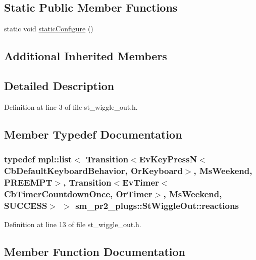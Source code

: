 \subsection*{Static Public Member Functions}
\begin{DoxyCompactItemize}
\item 
static void \hyperlink{structsm__pr2__plugs_1_1StWiggleOut_ad4db8d9b75e1fd0fb6641666d0b10554}{static\+Configure} ()
\end{DoxyCompactItemize}
\subsection*{Additional Inherited Members}


\subsection{Detailed Description}


Definition at line 3 of file st\+\_\+wiggle\+\_\+out.\+h.



\subsection{Member Typedef Documentation}
\subsubsection[{\texorpdfstring{reactions}{reactions}}]{\setlength{\rightskip}{0pt plus 5cm}typedef mpl\+::list$<$ Transition$<$Ev\+Key\+PressN$<$Cb\+Default\+Keyboard\+Behavior, {\bf Or\+Keyboard}$>$, {\bf Ms\+Weekend}, {\bf P\+R\+E\+E\+M\+PT}$>$, Transition$<$Ev\+Timer$<$Cb\+Timer\+Countdown\+Once, {\bf Or\+Timer}$>$, {\bf Ms\+Weekend}, {\bf S\+U\+C\+C\+E\+SS}$>$ $>$ {\bf sm\+\_\+pr2\+\_\+plugs\+::\+St\+Wiggle\+Out\+::reactions}}\hypertarget{structsm__pr2__plugs_1_1StWiggleOut_a05abb5f452bc304c789a91d0a0d4c80b}{}\label{structsm__pr2__plugs_1_1StWiggleOut_a05abb5f452bc304c789a91d0a0d4c80b}


Definition at line 13 of file st\+\_\+wiggle\+\_\+out.\+h.



\subsection{Member Function Documentation}
